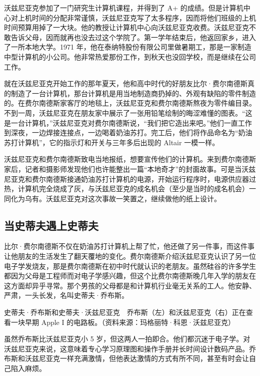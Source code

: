 \documentclass[12pt,UTF8]{ctexbook}
\begin{document}
沃兹尼亚克参加了一门研究生计算机课程，并得到了 A+ 的成绩。但是计算机中心对上机时间的分配非常谨慎，沃兹尼亚克写了太多程序，因而将他们班级的上机时间预算用掉了一大块。他的教授让计算机中心向沃兹尼亚克收费。沃兹尼亚克不敢告诉父母，因而就再也没去过这个学院了。第一学年结束后，他返回家乡，进入了一所本地大学。1971 年，他在泰纳特股份有限公司里做暑期工，那是一家制造中型计算机的小公司。他非常热爱那份工作，到秋天也没回学校，而是继续在公司工作。

就在沃兹尼亚克开始工作的那年夏天，他和高中时代的好朋友比尔·费尔南德斯真的制造了一台计算机，那台计算机是用当地制造商扔掉的、外观有缺陷的零件制造的。在费尔南德斯家客厅的地毯上，沃兹尼亚克和费尔南德斯熬夜为零件编目录。不到一周，沃兹尼亚克在朋友家中展示了一张用铅笔绘制的晦涩难懂的图表。“这是一台计算机，”沃兹尼亚克对费尔南德斯说，“我们把它造出来吧。”他们一直工作到深夜，一边焊接连接点，一边喝着奶油苏打。完工后，他们将作品命名为“奶油苏打计算机”，它的指示灯和开关与三年多后出现的 Altair 一模一样。

沃兹尼亚克和费尔南德斯致电当地报纸，想要宣传他们的计算机。来到费尔南德斯家后，记者和摄影师发现他们也许能整出一篇“本地奇才”的封面故事。可是当沃兹尼亚克和费尔南德斯接通奶油苏打计算机的电源，开始运行程序时，电源供应器过热，计算机完全烧成了灰，与沃兹尼亚克的成名机会（至少是当时的成名机会）一同化为乌有。沃兹尼亚克对这次事故一笑置之，继续做他的纸上设计。





\subsection{当史蒂夫遇上史蒂夫}


比尔·费尔南德斯不仅在奶油苏打计算机上帮了忙，他还做了另一件事，而这件事让他朋友的生活发生了翻天覆地的变化。费尔南德斯介绍沃兹尼亚克认识了另一位电子学发烧友，那是费尔南德斯在初中时代就认识的老朋友。虽然硅谷的许多学生都因为父母是工程师而对电子学感兴趣，但这个比费尔南德斯晚几年入学的朋友在这方面却异乎寻常。那个男孩的父母都是和计算机行业毫无关系的工人。他安静、严肃，一头长发，名叫史蒂夫·乔布斯。



史蒂夫·乔布斯和史蒂夫·沃兹尼亚克　乔布斯（左）和沃兹尼亚克（右）正在查看一块早期 Apple I 的电路板。（资料来源：玛格丽特·科恩·沃兹尼亚克）

虽然乔布斯比沃兹尼亚克小 5 岁，但这两人一拍即合。他们都沉迷于电子学。对沃兹尼亚克来说，这意味着专心学习原理图和操作手册并长时间设计数码产品。乔布斯和沃兹尼亚克一样充满激情，但他表达激情的方式有所不同，甚至有时会让自己陷入麻烦。
\end{document}
